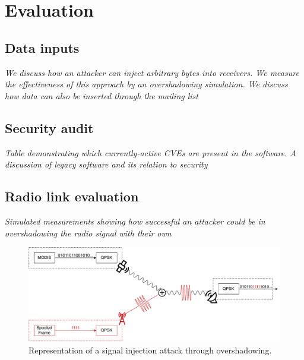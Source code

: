 \section{Evaluation}\label{sec:evaluation}

\subsection{Data inputs}

\textit{We discuss how an attacker can inject arbitrary bytes into receivers.  We measure the effectiveness of this approach by an overshadowing simulation.  We discuss how data can also be inserted through the mailing list}

\subsection{Security audit}
\textit{Table demonstrating which currently-active CVEs are present in the software. A discussion of legacy software and its relation to security}

\subsection{Radio link evaluation}
\textit{Simulated measurements showing how successful an attacker could be in overshadowing the radio signal with their own}



\begin{figure}
    \centering
    \includegraphics[width=\columnwidth]{diagrams/overshadowing_demo.pdf}
    \caption{Representation of a signal injection attack through overshadowing.}
    \label{fig:overshadowing_demo}
\end{figure}

